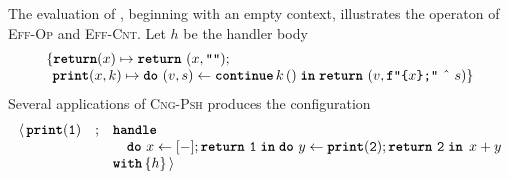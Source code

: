 The evaluation of , beginning with an empty context, illustrates the operaton of  \textsc{Eff-Op} and \textsc{Eff-Cnt}. Let $h$ be the handler body 
\[\begin{array}{l}\{ \textbf{\texttt{return}}(x) \mapsto {\texttt{\textbf{return}} \,\, {(x, \texttt{""})}}; \\
\; \, \textbf{\texttt{print}}(x, k) \mapsto {\texttt{\textbf{do}} \,\, {(v, s)} \leftarrow {\textbf{\texttt{continue}} \, {k} \, {()}} \; \textbf{\texttt{in}} \; {\texttt{\textbf{return}} \,\, {(v, \texttt{f"\{$x$\};"} \text{ \^\ } s)}}}\}\end{array}\]
Several applications of \textsc{Cng-Psh} produces the configuration
{  \arraycolsep=3pt
\small
\[\begin{array}{rcl}
  \langle \, \texttt{\textbf{print}}(\texttt{1}) &;& \textbf{\texttt{handle}}\\
                        && \quad \texttt{\textbf{do}} \,\, {x} \leftarrow {[-];\texttt{\textbf{return}} \,\, {\texttt{1}}} \; \textbf{\texttt{in}} \; {{\texttt{\textbf{do}} \,\, {y} \leftarrow {\texttt{\textbf{print}}(\texttt{2});\texttt{\textbf{return}} \,\, {\texttt{2}}} \; \textbf{\texttt{in}} \; {\, x + y}}} \\
                        && \textbf{\texttt{with}} \, \{ h \}\, \rangle
\end{array}
  \]
}

